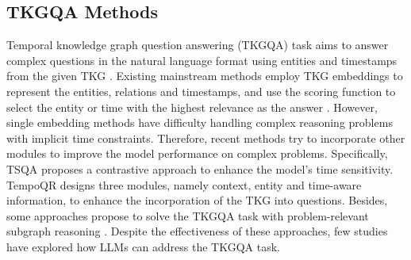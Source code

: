 \documentclass[11pt]{article}
\begin{document}

\subsection{TKGQA Methods}

Temporal knowledge graph question answering (TKGQA) task aims to answer complex questions in the natural language format using entities and timestamps from the given TKG \cite{TempQuestions,TimeQuestions,multiqa}.
Existing mainstream methods employ TKG embeddings to represent the entities, relations and timestamps, and use the scoring function to select the entity or time with the highest relevance as the answer \cite{cronqa}.
However, single embedding methods have difficulty handling complex reasoning problems with implicit time constraints. Therefore, recent methods try to incorporate other modules to improve the model performance on complex problems.
Specifically, TSQA \cite{TSQA} proposes a contrastive approach to enhance the model's time sensitivity.
TempoQR \cite{tempoqa} designs three modules, namely context, entity and time-aware information, to enhance the incorporation of the TKG into questions.
Besides, some approaches propose to solve the TKGQA task with problem-relevant subgraph reasoning \cite{subgraphreasoning,LGQA,TwiRGCN}.
Despite the effectiveness of these approaches, few studies have explored how LLMs can address the TKGQA task.
\end{document}
